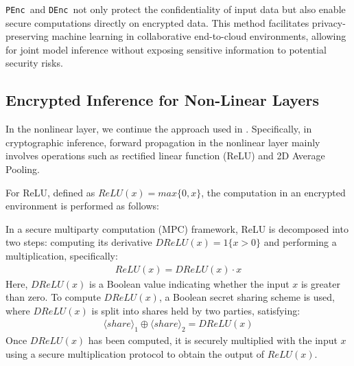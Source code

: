 \documentclass[conference]{IEEEtran}
\newcommand{\DEnc}{\texttt{DEnc}}
\newcommand{\PEnc}{\texttt{PEnc}}
\begin{document}
\PEnc~and \DEnc~not only protect the confidentiality of input data but also enable secure computations directly on encrypted data. This method facilitates privacy-preserving machine learning in collaborative end-to-cloud environments, allowing for joint model inference without exposing sensitive information to potential security risks.



\subsection{Encrypted Inference for Non-Linear Layers}

In the nonlinear layer, we continue the approach used in \cite{279898}. Specifically, in cryptographic inference, forward propagation in the nonlinear layer mainly involves operations such as rectified linear function (ReLU) and 2D Average Pooling.

 For ReLU, defined as $ReLU(x)=max\{0,x\}$, the computation in an encrypted environment is performed as follows:
 
 In a secure multiparty computation (MPC) framework, ReLU is decomposed into two steps: computing its derivative $DReLU(x)=1 \{x>0\}$ and performing a multiplication, specifically:
\begin{equation*}
\begin{array}{c}
       ReLU(x)=DReLU(x) \cdot x
\end{array}
\end{equation*}
Here, $DReLU(x)$ is a Boolean value indicating whether the input $x$ is greater than zero. To compute $DReLU(x)$, a Boolean secret sharing scheme is used, where $DReLU(x)$ is split into shares held by two parties, satisfying: 
\begin{equation*}
\begin{array}{c}
       \langle share\rangle_1\oplus\langle share\rangle_2=DReLU(x)
\end{array}
\end{equation*}
Once $DReLU(x)$ has been computed, it is securely multiplied with the input $x$ using a secure multiplication protocol to obtain the output of $ReLU(x)$.
\end{document}
